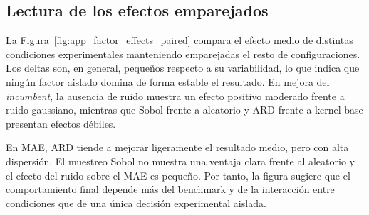 
\subsection*{Lectura de los efectos emparejados}

La Figura~\ref{fig:app_factor_effects_paired} compara el efecto medio de distintas condiciones experimentales manteniendo emparejadas el resto de configuraciones. Los deltas son, en general, pequeños respecto a su variabilidad, lo que indica que ningún factor aislado domina de forma estable el resultado. En mejora del \emph{incumbent}, la ausencia de ruido muestra un efecto positivo moderado frente a ruido gaussiano, mientras que Sobol frente a aleatorio y ARD frente a kernel base presentan efectos débiles.

En MAE, ARD tiende a mejorar ligeramente el resultado medio, pero con alta dispersión. El muestreo Sobol no muestra una ventaja clara frente al aleatorio y el efecto del ruido sobre el MAE es pequeño. Por tanto, la figura sugiere que el comportamiento final depende más del benchmark y de la interacción entre condiciones que de una única decisión experimental aislada.
